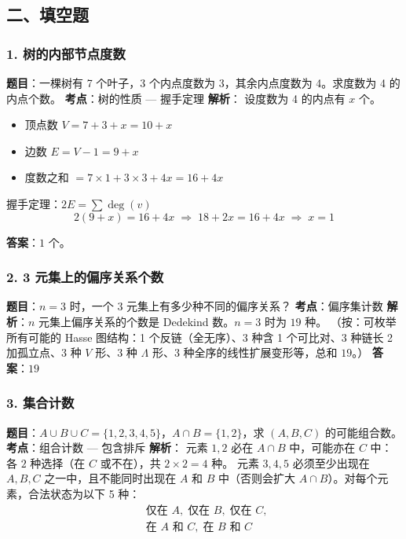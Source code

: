 \documentclass[10pt,a4paper,openany]{ctexbook}
\theoremstyle{definition}
\theoremstyle{remark}
\begin{document}
\subsection{二、填空题}

\subsubsection{1. 树的内部节点度数}

\textbf{题目}：一棵树有 7 个叶子，3 个内点度数为 3，其余内点度数为 4。求度数为 4 的内点个数。
\textbf{考点}：树的性质 — 握手定理
\textbf{解析}：
设度数为 4 的内点有 $x$ 个。
\begin{itemize}
\item 顶点数 $V = 7 + 3 + x = 10 + x$
\item 边数 $E = V - 1 = 9 + x$
\item 度数之和 $= 7 \times 1 + 3 \times 3 + 4x = 16 + 4x$

\end{itemize}

握手定理：$2E = \sum \deg(v)$
\[
 2(9 + x) = 16 + 4x \;\Rightarrow\; 18 + 2x = 16 + 4x \;\Rightarrow\; x = 1 
\]

\textbf{答案}：$\boxed{1}$ 个。
\vspace{-2pt}

\subsubsection{2. 3 元集上的偏序关系个数}

\textbf{题目}：$n = 3$ 时，一个 $3$ 元集上有多少种不同的偏序关系？
\textbf{考点}：偏序集计数
\textbf{解析}：$n$ 元集上偏序关系的个数是 Dedekind 数。$n=3$ 时为 $19$ 种。
（按：可枚举所有可能的 Hasse 图结构：1 个反链（全无序）、3 种含 1 个可比对、3 种链长 2 加孤立点、3 种 $V$ 形、3 种 $\Lambda$ 形、3 种全序的线性扩展变形等，总和 $19$。）
\textbf{答案}：$\boxed{19}$
\vspace{-2pt}

\subsubsection{3. 集合计数}

\textbf{题目}：$A \cup B \cup C = \{1,2,3,4,5\}$，$A \cap B = \{1,2\}$，求 $(A,B,C)$ 的可能组合数。
\textbf{考点}：组合计数 — 包含排斥
\textbf{解析}：
元素 $1,2$ 必在 $A \cap B$ 中，可能亦在 $C$ 中：各 $2$ 种选择（在 $C$ 或不在），共 $2 \times 2 = 4$ 种。
元素 $3,4,5$ 必须至少出现在 $A,B,C$ 之一中，且不能同时出现在 $A$ 和 $B$ 中（否则会扩大 $A \cap B$）。对每个元素，合法状态为以下 5 种：
\[
\begin{aligned}
&\text{仅在 }A,\; \text{仅在 }B,\; \text{仅在 }C,\; \\
&\text{在 }A\text{ 和 }C,\; \text{在 }B\text{ 和 }C
\end{aligned}
\]
\end{document}
